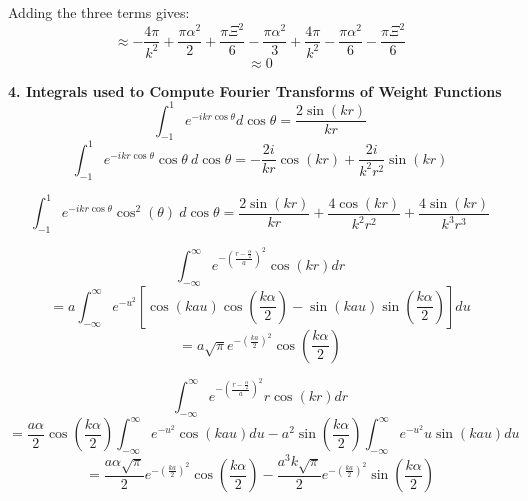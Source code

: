 \documentclass[double,12pt]{beavtex}
\begin{document}
Adding the three terms gives:
\begin{displaymath}{\approx-\frac{4\pi}{k^2}+\frac{\pi\alpha^2}{2}+\frac{\pi\Xi^2}{6}-\frac{\pi\alpha^2}{3}+\frac{4\pi}{k^2}-\frac{\pi\alpha^2}{6}-\frac{\pi\Xi^2}{6}}\end{displaymath} 
\begin{displaymath}{\approx0}\end{displaymath} 

\textbf{4. Integrals used to Compute Fourier Transforms of Weight Functions}
\begin{equation}{\int_{-1}^{1}{e^{-ikr\cos{\theta}}d{\cos{\theta}}}=\frac{2\sin(kr)}{kr}}\end{equation} 
\begin{equation}{\int_{-1}^{1}{e^{-ikr\cos{\theta}}\cos{\theta}{~}d{\cos{\theta}}}=-\frac{2i}{kr}\cos(kr)+\frac{2i}{k^2r^2}\sin(kr)}\end{equation} 

\begin{equation}{\int_{-1}^{1}{e^{-ikr\cos{\theta}}\cos^2(\theta)~d{\cos{\theta}}}=\frac{2\sin(kr)}{kr}+\frac{4\cos(kr)}{k^2r^2}+\frac{4\sin(kr)}{k^3r^3}}\end{equation} 

\begin{equation}{\int_{-\infty}^{\infty}{e^{-\left(\frac{r-\frac{\alpha}{2}}{a}\right)^2}\cos(kr)d{r}}}\end{equation}
\begin{displaymath}{=a\int_{-\infty}^{\infty}{e^{-u^2}\left[\cos(kau)\cos(\frac{k\alpha}{2})-\sin(kau)\sin(\frac{k\alpha}{2})\right]d{u}}}\end{displaymath}  
\begin{equation}{=a\sqrt{\pi}e^{-\left(\frac{ka}{2}\right)^2}\cos(\frac{k\alpha}{2})}\end{equation} 

\begin{equation}{\int_{-\infty}^{\infty}{e^{-\left(\frac{r-\frac{\alpha}{2}}{a}\right)^2}r\cos(kr)d{r}}}\end{equation}
\begin{equation}{=\frac{a\alpha}{2}\cos\left(\frac{k\alpha}{2}\right)\int_{-\infty}^{\infty}{e^{-u^2}\cos(kau)d{u}} -a^2\sin\left(\frac{k\alpha}{2}\right)\int_{-\infty}^{\infty}{e^{-u^2}u\sin(kau)d{u}}}\end{equation}
\begin{equation}{=\frac{a\alpha\sqrt{\pi}}{2}e^{-\left(\frac{ka}{2}\right)^2}\cos\left(\frac{k\alpha}{2}\right)-\frac{a^3k\sqrt{\pi}}{2}e^{-\left(\frac{ka}{2}\right)^2}\sin\left(\frac{k\alpha}{2}\right)}\end{equation}
\end{document}
